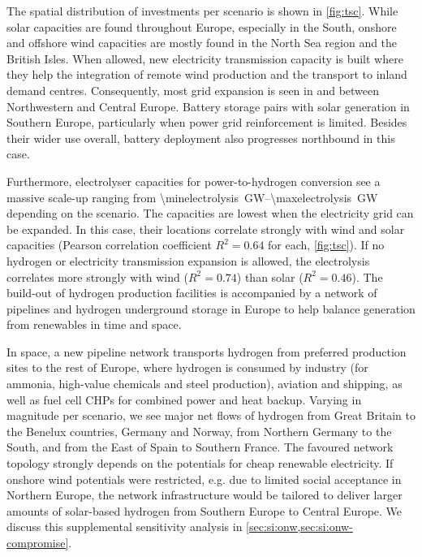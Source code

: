The spatial distribution of investments per scenario is shown in \cref{fig:tsc}.
While solar capacities are found throughout Europe, especially in the South,
onshore and offshore wind capacities are mostly found in the North Sea region
and the British Isles. When allowed, new electricity transmission capacity is
built where they help the integration of remote wind production and the
transport to inland demand centres. Consequently, most grid expansion is seen in
and between Northwestern and Central Europe. Battery storage pairs with solar
generation in Southern Europe, particularly when power grid reinforcement is
limited. Besides their wider use overall, battery deployment also progresses
northbound in this case.

Furthermore, electrolyser capacities for power-to-hydrogen conversion see a
massive scale-up ranging from
\SIrange{\minelectrolysis}{\maxelectrolysis}{\giga\watt} depending on the
scenario. The capacities are lowest when the electricity grid can be expanded.
In this case, their locations correlate strongly with wind and solar capacities
(Pearson correlation coefficient $R^2=0.64$ for each, \cref{fig:tsc}). If no
hydrogen or electricity transmission expansion is allowed, the electrolysis
correlates more strongly with wind ($R^2=0.74$) than solar ($R^2=0.46$). The
build-out of hydrogen production facilities is accompanied by a network of
pipelines and hydrogen underground storage in Europe to help balance generation
from renewables in time and space.

In space, a new pipeline network transports hydrogen from preferred production
sites to the rest of Europe, where hydrogen is consumed by industry (for
ammonia, high-value chemicals and steel production), aviation and shipping, as
well as fuel cell CHPs for combined power and heat backup. Varying in magnitude
per scenario, we see major net flows of hydrogen from Great Britain to the
Benelux countries, Germany and Norway, from Northern Germany to the South, and
from the East of Spain to Southern France. The favoured network topology
strongly depends on the potentials for cheap renewable electricity. If onshore
wind potentials were restricted, e.g. due to limited social acceptance in
Northern Europe, the network infrastructure would be tailored to deliver larger
amounts of solar-based hydrogen from Southern Europe to Central Europe. We
discuss this supplemental sensitivity analysis in
\cref{sec:si:onw,sec:si:onw-compromise}.

